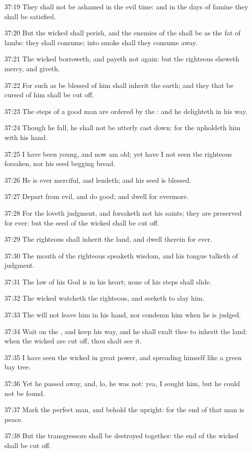 37:19 They shall not be ashamed in the evil time: and in the days of
famine they shall be satisfied.

37:20 But the wicked shall perish, and the enemies of the \LORD shall
be as the fat of lambs: they shall consume; into smoke shall they
consume away.

37:21 The wicked borroweth, and payeth not again: but the righteous
sheweth mercy, and giveth.

37:22 For such as be blessed of him shall inherit the earth; and they
that be cursed of him shall be cut off.

37:23 The steps of a good man are ordered by the \LORD: and he
delighteth in his way.

37:24 Though he fall, he shall not be utterly cast down: for the \LORD
upholdeth him with his hand.

37:25 I have been young, and now am old; yet have I not seen the
righteous forsaken, nor his seed begging bread.

37:26 He is ever merciful, and lendeth; and his seed is blessed.

37:27 Depart from evil, and do good; and dwell for evermore.

37:28 For the \LORD loveth judgment, and forsaketh not his saints; they
are preserved for ever: but the seed of the wicked shall be cut off.

37:29 The righteous shall inherit the land, and dwell therein for
ever.

37:30 The mouth of the righteous speaketh wisdom, and his tongue
talketh of judgment.

37:31 The law of his God is in his heart; none of his steps shall
slide.

37:32 The wicked watcheth the righteous, and seeketh to slay him.

37:33 The \LORD will not leave him in his hand, nor condemn him when he
is judged.

37:34 Wait on the \LORD, and keep his way, and he shall exalt thee to
inherit the land: when the wicked are cut off, thou shalt see it.

37:35 I have seen the wicked in great power, and spreading himself
like a green bay tree.

37:36 Yet he passed away, and, lo, he was not: yea, I sought him, but
he could not be found.

37:37 Mark the perfect man, and behold the upright: for the end of
that man is peace.

37:38 But the transgressors shall be destroyed together: the end of
the wicked shall be cut off.

